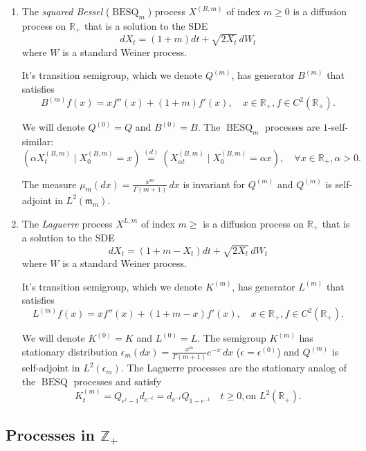\documentclass[11pt,a4,reqno]{amsart}
\numberwithin{equation}{section}
\theoremstyle{definition}
\theoremstyle{remark}
\newcommand{\bb}[1]{\mathbb{#1}}
\newcommand{\frk}[1]{\mathfrak{#1}}
\newcommand{\R}{\bb{R}}
\newcommand{\Z}{\bb{Z}}
\DeclareMathOperator{\besq}{BESQ}
\newcommand{\beq}{\begin{equation}}
\newcommand{\eeq}{\end{equation}}
\begin{document}
	\begin{enumerate}
	
		\item The \textit{squared Bessel} ($\besq_m$) process $X^{(B, m)}$ of index $m \geq 0$ is a diffusion process on $\R_+$ that is a solution to the SDE
		\beq dX_t = (1 + m) dt + \sqrt{2X_t} \, dW_t \eeq
		where $W$ is a standard Weiner process. 
		
		It's transition semigroup, which we denote $Q^{(m)}$, has generator $B^{(m)}$ that satisfies
		\beq B^{(m)}f(x) = x f''(x) + (1 + m) f'(x), \quad x \in \R_+, f \in C^2(\R_+). \eeq
		
		We will denote $Q^{(0)} = Q$ and $B^{(0)} = B$. The $\besq_m$ processes are $1$-self-similar:
		\beq \label{eqn:self_similar_besq} ( \alpha X_t^{(B, m)} \mid X_0^{(B, m)} = x) \overset{(d)}{=} (X_{\alpha t}^{(B, m)} \mid X_0^{(B, m)} = \alpha x), \quad \forall x \in \R_+, \alpha > 0 . \eeq
		
		The measure $\mu_m(dx) = \frac{x^m}{\Gamma(m + 1)} \, dx$ is invariant for $Q^{(m)}$ and $Q^{(m)}$ is self-adjoint in $L^2(\frk{m}_m)$. 	
		
		\item The \textit{Laguerre} process $X^{L, m}$ of index $m \geq $ is a diffusion process on $\R_+$ that is a solution to the SDE 
		\beq dX_t = (1 + m - X_t) dt + \sqrt{2X_t} \, dW_t \eeq
		where $W$ is a standard Weiner process. 
		
		It's transition semigroup, which we denote $K^{(m)}$, has generator $L^{(m)}$ that satisfies
		\beq L^{(m)}f(x) = x f''(x) + (1 + m - x) f'(x), \quad x \in \R_+, f \in C^2(\R_+). \eeq
		
		We will denote $K^{(0)} = K$ and $L^{(0)} = L$. The semigroup $K^{(m)}$ has stationary distribution $\epsilon_m(dx) = \frac{x^m}{\Gamma(m + 1)} e^{-x} \, dx$ ($\epsilon = \epsilon^{(0)}$) and $Q^{(m)}$ is self-adjoint in $L^2(\epsilon_m)$. The Laguerre processes are the stationary analog of the $\besq$ processes and satisfy 
		\beq \label{eqn:besq_lag} K^{(m)}_t = Q_{e^t - 1} d_{e^{-t}} = d_{e^{-t}} Q_{1 - e^{-t}} \quad t \geq 0, \text{on } L^2(\R_+) . \eeq
		
	\end{enumerate}
	
	
\subsection{Processes in $\Z_+$}
\end{document}

